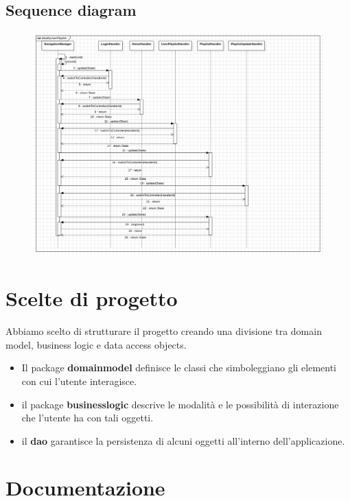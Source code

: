 \documentclass{article}
\begin{document}
  \subsection{Sequence diagram}
  \begin{figure}[H]
    \includegraphics[scale=0.30]{sequenze01}
  \end{figure}

  \section{Scelte di progetto}

  Abbiamo scelto di strutturare il progetto creando una divisione tra domain model, business logic e data
  access objects.
  \begin{itemize}
    \item
    Il package  \textbf{domainmodel} definisce le classi che simboleggiano gli elementi con cui l'utente
    interagisce.
    \item
    il package \textbf{businesslogic} descrive le modalità e le possibilità di interazione che l'utente
    ha con tali oggetti.
    \item
    il \textbf{dao} garantisce la persistenza di alcuni oggetti all'interno dell'applicazione.

  \end{itemize}

  \section{Documentazione}
\end{document}
